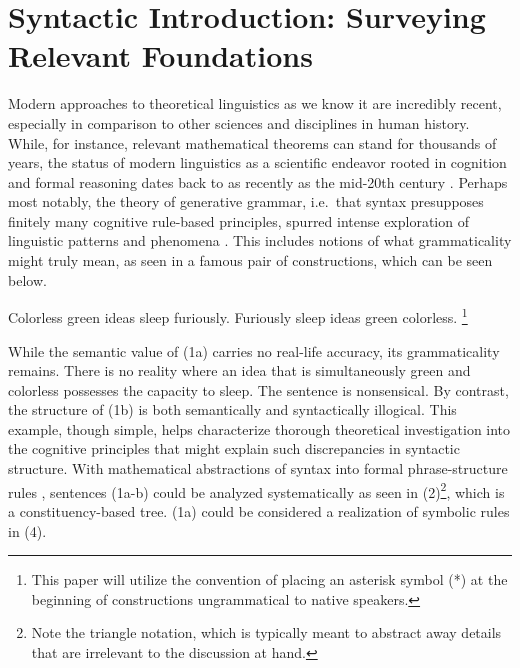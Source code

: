\documentclass{article}
\begin{document}
\section{Syntactic Introduction: Surveying Relevant Foundations}

Modern approaches to theoretical linguistics as we know it are incredibly recent, especially in comparison to other sciences and disciplines in human history. While, for instance, relevant mathematical theorems can stand for thousands of years, the status of modern linguistics as a scientific endeavor rooted in cognition and formal reasoning dates back to as recently as the mid-20th century \citep{StokhofvanLambalgen2011}. Perhaps most notably, the theory of generative grammar, i.e.\ that syntax presupposes finitely many cognitive rule-based principles, spurred intense exploration of linguistic patterns and phenomena \citep{Chomsky57}. This includes notions of what grammaticality might truly mean, as seen in a famous pair of constructions, which can be seen below. 

\ea \label{XlistExample}
    \begin{xlist}
    \ex Colorless green ideas sleep furiously. \citep[p.~3]{Chomsky57}
    \ex *Furiously sleep ideas green colorless. \citep[p.~3]{Chomsky57}\footnote{This paper will utilize the convention of placing an asterisk symbol (*) at the beginning of constructions ungrammatical to native speakers.}
    \end{xlist}
\z 

\noindent While the semantic value of (1a) carries no real-life accuracy, its grammaticality remains. There is no reality where an idea that is simultaneously green and colorless possesses the capacity to sleep. The sentence is nonsensical. By contrast, the structure of (1b) is both semantically and syntactically illogical. This example, though simple, helps characterize thorough theoretical investigation into the cognitive principles that might explain such discrepancies in syntactic structure. With mathematical abstractions of syntax into formal phrase-structure rules \citep{Chomsky56,ChomskySchutzenberger63,PullumGazdar82}, sentences (1a-b) could be analyzed systematically as seen in (2)\footnote{Note the triangle notation, which is typically meant to abstract away details that are irrelevant to the discussion at hand.}, which is a constituency-based tree. (1a) could be considered a realization of symbolic rules in (4). 
\end{document}
